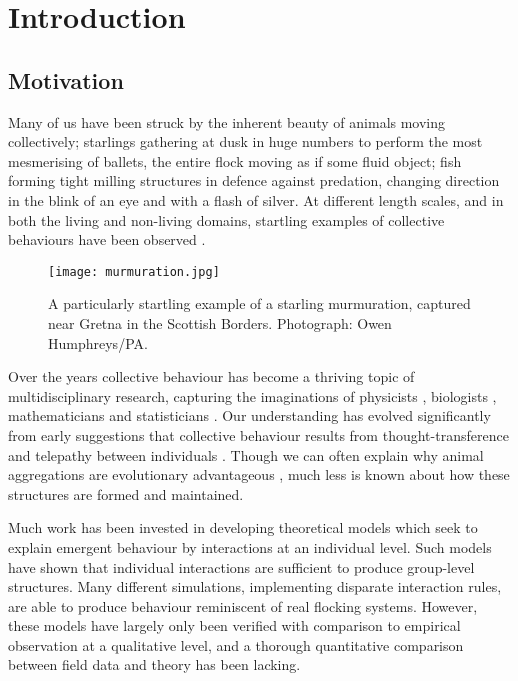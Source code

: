 \chapter{Introduction}
\label{cha:introduction}

\section{Motivation}
\label{sec:motivation}

Many of us have been struck by the inherent beauty of animals moving collectively; starlings gathering at dusk in huge numbers to perform the most mesmerising of ballets, the entire flock moving as if some fluid object; fish forming tight milling structures in defence against predation, changing direction in the blink of an eye and with a flash of silver. At different length scales, and in both the living and non-living domains, startling examples of collective behaviours have been observed \citep{parrish99}.

\begin{figure}[!htbp]
	\texttt{[image: murmuration.jpg]}
	\caption{A particularly startling example of a starling murmuration, captured near Gretna in the Scottish Borders. Photograph: Owen Humphreys/PA.}
	\label{fig:murmuration}
\end{figure}

Over the years collective behaviour has become a thriving topic of multidisciplinary research, capturing the imaginations of physicists \citep{vicsek95}, biologists \citep{couzin02}, mathematicians \citep{lukeman10} and statisticians \citep{mann11}. Our understanding has evolved significantly from early suggestions that collective behaviour results from thought-transference and telepathy between individuals \citep{selous31}. Though we can often explain why animal aggregations are evolutionary advantageous \citep{giardina08}, much less is known about how these structures are formed and maintained.

Much work has been invested in developing theoretical models which seek to explain emergent behaviour by interactions at an individual level. Such models have shown that individual interactions are sufficient to produce group-level structures. Many different simulations, implementing disparate interaction rules, are able to produce behaviour reminiscent of real flocking systems. However, these models have largely only been verified with comparison to empirical observation at a qualitative level, and a thorough quantitative comparison between field data and theory has been lacking.


